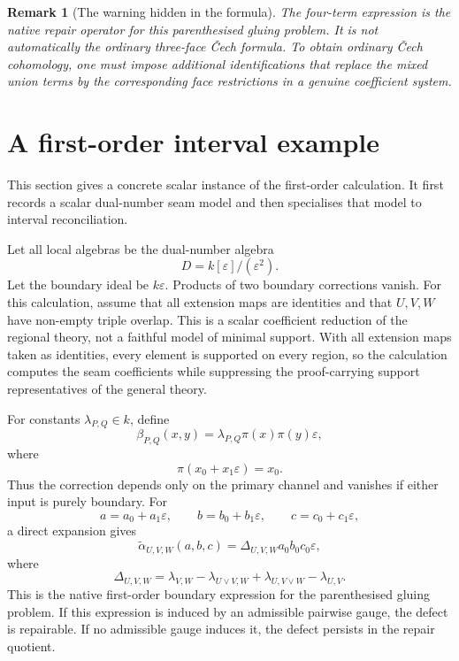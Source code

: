\documentclass[11pt]{article}
\newtheorem{remark}[theorem]{Remark}
\begin{document}
\begin{remark}[The warning hidden in the formula]
The four-term expression is the native repair operator for this parenthesised gluing problem. It is not automatically the ordinary three-face \v{C}ech formula. To obtain ordinary \v{C}ech cohomology, one must impose additional identifications that replace the mixed union terms by the corresponding face restrictions in a genuine coefficient system.
\end{remark}

\section{A first-order interval example}\label{sec:interval-example}

This section gives a concrete scalar instance of the first-order calculation. It first records a scalar dual-number seam model and then specialises that model to interval reconciliation.

Let all local algebras be the dual-number algebra
\[
D=k[\varepsilon]/(\varepsilon^2).
\]
Let the boundary ideal be \(k\varepsilon\). Products of two boundary corrections vanish. For this calculation, assume that all extension maps are identities and that \(U,V,W\) have non-empty triple overlap. This is a scalar coefficient reduction of the regional theory, not a faithful model of minimal support. With all extension maps taken as identities, every element is supported on every region, so the calculation computes the seam coefficients while suppressing the proof-carrying support representatives of the general theory.

For constants \(\lambda_{P,Q}\in k\), define
\[
\beta_{P,Q}(x,y)=\lambda_{P,Q}\pi(x)\pi(y)\varepsilon,
\]
where
\[
\pi(x_0+x_1\varepsilon)=x_0.
\]
Thus the correction depends only on the primary channel and vanishes if either input is purely boundary. For
\[
a=a_0+a_1\varepsilon,
\qquad
b=b_0+b_1\varepsilon,
\qquad
c=c_0+c_1\varepsilon,
\]
a direct expansion gives
\[
\widetilde\alpha_{U,V,W}(a,b,c)=\Delta_{U,V,W}a_0b_0c_0\varepsilon,
\]
where
\[
\Delta_{U,V,W}
=
\lambda_{V,W}-\lambda_{U\vee V,W}+\lambda_{U,V\vee W}-\lambda_{U,V}.
\]
This is the native first-order boundary expression for the parenthesised gluing problem. If this expression is induced by an admissible pairwise gauge, the defect is repairable. If no admissible gauge induces it, the defect persists in the repair quotient.
\end{document}
